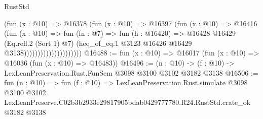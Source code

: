 \begin{lexlean}{RustStd}
\begin{coremodule}
                                    (fun (x : @10) =>
                                    @16378
                                      (fun (x : @10) =>
                                      @16397
                                        (fun (x : @10) =>
                                        @16416
                                          (fun (x : @10) =>
                                          fun (fn : @7) =>
                                          fun (h : @16420) =>
                                          @16428
                                            @16429
                                            (Eq.refl.{2} (Sort 1) @7)
                                            (heq_of_eq.{1}
                                              @3123
                                              @16426
                                              @16429
                                              @3138)))))))))))))))))))))
@16488 := fun (x : @10) => @16017 (fun (x : @10) => @16036 (fun (x : @10) => @16483))
@16496 := (n : @10) -> (f : @10) -> LexLeanPreservation.Rust.FunSem @3098 @3100 @3102 @3182 @3138
@16506 := fun (n : @10) =>
  fun (f : @10) =>
  LexLeanPreservation.Rust.simulate
    @3098
    @3100
    @3102
    LexLeanPreserve.C02b3b2933e29817905bdab0429777780.R24.RustStd.crate_ok
    @3182
    @3138
\end{coremodule}
\end{lexlean}
